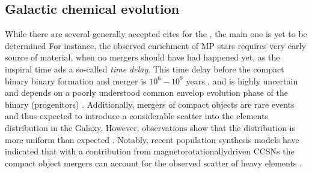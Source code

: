 \subsection{Galactic chemical evolution}

While there are several generally accepted cites for the \rproc{}, the main one is yet to be 
determined \citep[\eg][]{Qian:2000bh,Argast:2003he,Matteucci:2014}
%
For instance, the observed \rproc{} enrichment of \ac{MP} stars 
requires very early source of \rproc{} material, when no mergers 
should have had happened yet, as the inspiral time ads a so-called \textit{time delay}.
This time delay before the compact binary binary formation and merger is 
$10^{6} - 10^{9}$ years \citep{DeDonder:2004cx,Dominik:2012kk}, and is highly uncertain and 
depends on a poorly understood common envelop evolution phase of the binary (progenitors)
\citep[\eg]{Dominik:2012kk}. 
Additionally, mergers of compact objects are rare events and thus expected to introduce 
a considerable scatter into the \rproc{} elements distribution in the Galaxy. 
However, observations show that the distribution is more uniform than expected \citep{Argast:2003he}.
Notably, recent population synthesis models have indicated that with a contribution from 
magnetorotationallydriven \acp{CCSN} the compact object mergers can account for the 
observed scatter of heavy elements \citep{Ishimaru:2015,Cescutti:2015,Wehmeyer:2015,VanDeVoort:2015}.
%
